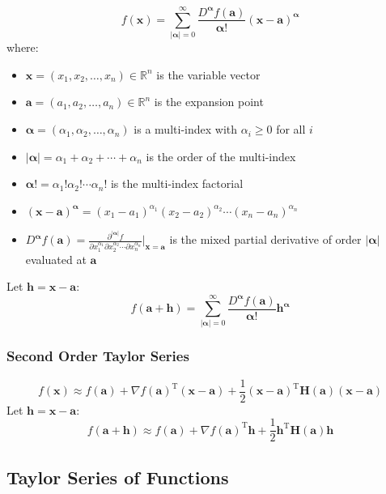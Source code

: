 \documentclass{article}
\begin{document}
\[
    f(\mathbf{x}) = \sum_{|\boldsymbol{\alpha}|=0}^{\infty} \frac{D^{\boldsymbol{\alpha}} f(\mathbf{a})}{\boldsymbol{\alpha}!} (\mathbf{x} - \mathbf{a})^{\boldsymbol{\alpha}}
\]
where:
\begin{itemize}
    \item $\mathbf{x} = (x_1, x_2, \ldots, x_n) \in \mathbb{R}^n$ is the variable vector
    \item $\mathbf{a} = (a_1, a_2, \ldots, a_n) \in \mathbb{R}^n$ is the expansion point
    \item $\boldsymbol{\alpha} = (\alpha_1, \alpha_2, \ldots, \alpha_n)$ is a multi-index with $\alpha_i \geq 0$ for all $i$
    \item $|\boldsymbol{\alpha}| = \alpha_1 + \alpha_2 + \cdots + \alpha_n$ is the order of the multi-index
    \item $\boldsymbol{\alpha}! = \alpha_1! \alpha_2! \cdots \alpha_n!$ is the multi-index factorial
    \item $(\mathbf{x} - \mathbf{a})^{\boldsymbol{\alpha}} = (x_1 - a_1)^{\alpha_1} (x_2 - a_2)^{\alpha_2} \cdots (x_n - a_n)^{\alpha_n}$
    \item $D^{\boldsymbol{\alpha}} f(\mathbf{a}) = \frac{\partial^{|\boldsymbol{\alpha}|} f}{\partial x_1^{\alpha_1} \partial x_2^{\alpha_2} \cdots \partial x_n^{\alpha_n}}\bigg|_{\mathbf{x}=\mathbf{a}}$ is the mixed partial derivative of order $|\boldsymbol{\alpha}|$ evaluated at $\mathbf{a}$
\end{itemize}
Let $\mathbf{h} = \mathbf{x} - \mathbf{a}$:
\[
    f(\mathbf{a} + \mathbf{h}) = \sum_{|\boldsymbol{\alpha}|=0}^{\infty} \frac{D^{\boldsymbol{\alpha}} f(\mathbf{a})}{\boldsymbol{\alpha}!} \mathbf{h}^{\boldsymbol{\alpha}}
\]

\subsubsection{Second Order Taylor Series}
\[
    f(\mathbf{x}) \approx f(\mathbf{a}) + \nabla f(\mathbf{a})^{\mathrm{T}} (\mathbf{x}-\mathbf{a}) + \frac{1}{2} (\mathbf{x}-\mathbf{a})^{\mathrm{T}} \mathbf{H}(\mathbf{a}) (\mathbf{x}-\mathbf{a})
\]
Let $\mathbf{h} = \mathbf{x} - \mathbf{a}$:
\[
    f(\mathbf{a} + \mathbf{h}) \approx f(\mathbf{a}) + \nabla f(\mathbf{a})^{\mathrm{T}} \mathbf{h} + \frac{1}{2} \mathbf{h}^{\mathrm{T}} \mathbf{H}(\mathbf{a}) \mathbf{h}
\]

\subsection{Taylor Series of Functions}
\end{document}
